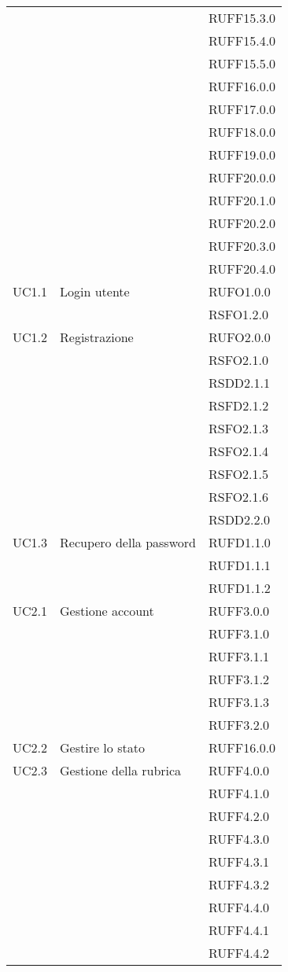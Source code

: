 \begin{center}
\begin{longtable}{lp{}l}
 &  & RUFF15.3.0 \\
 &  & RUFF15.4.0 \\
 &  & RUFF15.5.0 \\
 &  & RUFF16.0.0 \\
 &  & RUFF17.0.0 \\
 &  & RUFF18.0.0 \\
 &  & RUFF19.0.0 \\
 &  & RUFF20.0.0 \\
 &  & RUFF20.1.0 \\
 &  & RUFF20.2.0 \\
 &  & RUFF20.3.0 \\
 &  & RUFF20.4.0 \\
UC1.1 & Login utente & RUFO1.0.0 \\
 &  & RSFO1.2.0 \\
UC1.2 & Registrazione & RUFO2.0.0 \\
 &  & RSFO2.1.0 \\
 &  & RSDD2.1.1 \\
 &  & RSFD2.1.2 \\
 &  & RSFO2.1.3 \\
 &  & RSFO2.1.4 \\
 &  & RSFO2.1.5 \\
 &  & RSFO2.1.6 \\    
 &  & RSDD2.2.0 \\
UC1.3 & Recupero della password & RUFD1.1.0 \\
 &  & RUFD1.1.1 \\
 &  & RUFD1.1.2 \\
UC2.1 & Gestione account & RUFF3.0.0 \\
 &  & RUFF3.1.0 \\
 &  & RUFF3.1.1 \\
 &  & RUFF3.1.2 \\
 &  & RUFF3.1.3 \\
 &  & RUFF3.2.0 \\
UC2.2 & Gestire lo stato & RUFF16.0.0 \\
UC2.3 & Gestione della rubrica & RUFF4.0.0 \\
 &  & RUFF4.1.0 \\
 &  & RUFF4.2.0 \\
 &  & RUFF4.3.0 \\
 &  & RUFF4.3.1 \\
 &  & RUFF4.3.2 \\
 &  & RUFF4.4.0 \\
 &  & RUFF4.4.1 \\
 &  & RUFF4.4.2 \\

\end{longtable}
\end{center}
